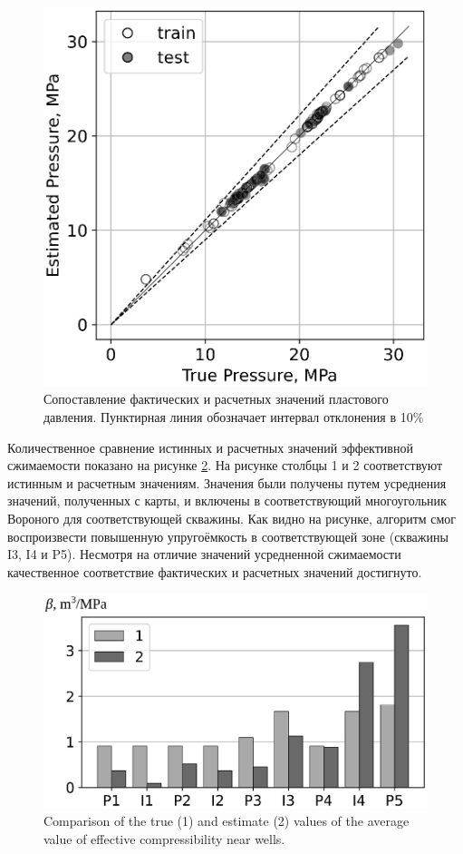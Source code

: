 \documentclass{article}
\begin{document}
\begin{figure}
	\centering
	\includegraphics[width=0.7\linewidth]{images/fig6.eps}
	\caption{Сопоставление фактических и расчетных значений пластового давления. Пунктирная линия обозначает интервал отклонения в 10\%}
	\label{fig:cp}
\end{figure}

Количественное сравнение истинных и расчетных значений эффективной сжимаемости показано на рисунке \ref{fig:hist}. На рисунке столбцы 1 и 2 соответствуют истинным и расчетным значениям. Значения были получены путем усреднения значений, полученных с карты, и включены в соответствующий многоугольник Вороного для соответствующей скважины. Как видно на рисунке, алгоритм смог воспроизвести повышенную упругоёмкость в соответствующей зоне (скважины I3, I4 и P5). Несмотря на отличие значений усредненной сжимаемости качественное соответствие фактических и расчетных значений достигнуто.

\begin{figure}
	\centering
	\includegraphics[width=0.7\linewidth]{images/fig7.eps}
	\caption{Comparison of the true (1) and estimate (2) values of the average value of effective compressibility near wells.}
	\label{fig:hist}
\end{figure}
\end{document}
